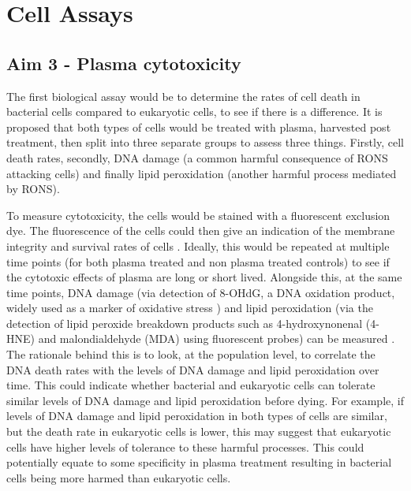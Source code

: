\documentclass[11pt, oneside]{article}   	%
\begin{document}
\section*{Cell Assays}

\subsection*{Aim 3 - Plasma cytotoxicity}
The first biological assay would be to determine the rates of cell death in bacterial cells compared to eukaryotic cells, to see if there is a difference.
It is proposed that both types of cells would be treated with plasma, harvested post treatment, then split into three separate groups to assess three things. Firstly, cell death rates, secondly, DNA damage (a common harmful consequence of RONS attacking cells) and finally lipid peroxidation (another harmful process mediated by RONS).

To measure cytotoxicity, the cells would be stained with a fluorescent exclusion dye. The fluorescence of the cells could then give an indication of the membrane integrity and survival rates of cells \cite{Kepp2011cell}. Ideally, this would be repeated at multiple time points (for both plasma treated and non plasma treated controls) to see if the cytotoxic effects of plasma are long or short lived.
Alongside this, at the same time points, DNA damage (via detection of 8-OHdG, a DNA oxidation product, widely used as a marker of oxidative stress \cite{Valavanidis20098, Dizdaroglu2012oxidatively}) and lipid peroxidation (via the detection of lipid peroxide breakdown products such as 4-hydroxynonenal (4-HNE) and malondialdehyde (MDA) \cite{Ayala2014lipid} using fluorescent probes) can be measured \cite{Joshi2010control, Joshi2011nonthermal}. 
The rationale behind this is to look, at the population level, to correlate the DNA death rates with the levels of DNA damage and lipid peroxidation over time. This could indicate whether bacterial and eukaryotic cells can tolerate similar levels of DNA damage and lipid peroxidation before dying. For example, if levels of DNA damage and lipid peroxidation in both types of cells are similar, but the death rate in eukaryotic cells is lower, this may suggest that eukaryotic cells have higher levels of tolerance to these harmful processes. This could potentially equate to some specificity in plasma treatment resulting in bacterial cells being more harmed than eukaryotic cells.
\end{document}
